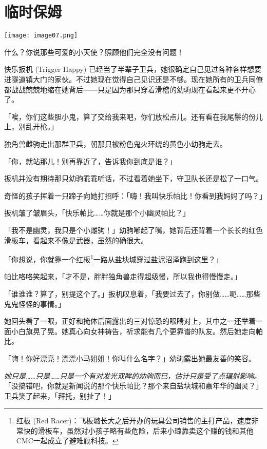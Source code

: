 \chapter{临时保姆}

\texttt{[image: image07.png]}


\begin{intro}
    什么？你说那些可爱的小天使？照顾他们完全没有问题！
\end{intro}


快乐扳机 (Trigger Happy) 已经当了半辈子卫兵，她很确定自己见过各种各样想要进隧道镇大门的家伙。不过她现在觉得自己见识还是不够。现在她所有的卫兵同僚都战战兢兢地缩在她背后——只是因为那只穿着滑稽的幼驹现在看起来更不开心了。

「唉，你们这些胆小鬼，算了交给我来吧，你们放松点儿。还有看在我尾鬃的份儿上，别乱开枪。」

独角兽雌驹走出那群卫兵，朝那只被粉色鬼火环绕的黄色小幼驹走去。

「你，就站那儿！别再靠近了，告诉我你到底是谁？」

扳机并没有期待那只幼驹乖乖听话，不过看着她坐下，守卫队长还是松了一口气。

奇怪的孩子挥着一只蹄子向她打招呼：「嗨！我叫快乐帕比！你看到我妈妈了吗？」

扳机皱了皱眉头，「快乐帕比……你就是那个小幽灵帕比？」

「我不是幽灵，我只是个小雌驹！」幼驹嘟起了嘴，她背后还背着一个长长的红色滑板车，看起来不像是武器，虽然的确很大。

「你想说，你就靠一个红板\footnote{红板 (Red Racer)：飞板璐长大之后开办的玩具公司销售的主打产品，速度非常快的滑板车，虽然对小孩子略有些危险，后来小璐靠卖这个赚的钱和其他CMC一起成立了避难厩科技。}一路从盐块城穿过盐泥沼泽跑到这里？」

帕比咯咯笑起来，「才不是，胖胖独角兽走得超级慢，所以我也得慢慢走。」

「谁谁谁？算了，别提这个了。」扳机叹息着，「我要过去了，你别做……呃……那些鬼鬼怪怪的事情。」

她回头看了一眼，正好和掩体后面露出的三对惊恐的眼睛对上，其中之一还举着一面小白旗晃了晃。她真心向女神祷告，祈求能有几个更靠谱的队友。然后她走向帕比。

「嗨！你好漂亮！漂漂小马姐姐！你叫什么名字？」幼驹露出她最友善的笑容。

\emph{她只是……只是……只是一个有对发光双眸的幼驹而已，估计只是受了点辐射影响。}「没搞错吧，你就是新闻说的那个快乐帕比？那个来自盐块城和嘉年华的幽灵？」卫兵笑了起来，「拜托，别扯了！」

